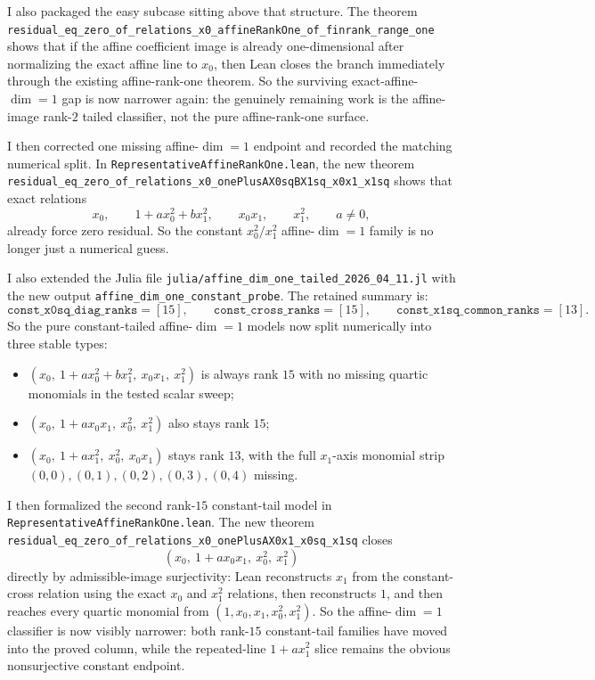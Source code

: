 \documentclass[11pt]{article}
\begin{document}
I also packaged the easy subcase sitting above that structure. The theorem
\texttt{residual\_eq\_zero\_of\_relations\_x0\_affineRankOne\_of\_finrank\_range\_one}
shows that if the affine coefficient image is already one-dimensional after
normalizing the exact affine line to \(x_0\), then Lean closes the branch
immediately through the existing affine-rank-one theorem. So the surviving
exact-affine-\(\dim=1\) gap is now narrower again: the genuinely remaining work
is the affine-image rank-\(2\) tailed classifier, not the pure affine-rank-one
surface.

I then corrected one missing affine-\(\dim=1\) endpoint and recorded the
matching numerical split. In
\texttt{RepresentativeAffineRankOne.lean}, the new theorem
\texttt{residual\_eq\_zero\_of\_relations\_x0\_onePlusAX0sqBX1sq\_x0x1\_x1sq}
shows that exact relations
\[
  x_0,\qquad 1 + a x_0^2 + b x_1^2,\qquad x_0x_1,\qquad x_1^2,
  \qquad a \ne 0,
\]
already force zero residual. So the constant \(x_0^2/x_1^2\) affine-\(\dim=1\)
family is no longer just a numerical guess.

I also extended the Julia file
\texttt{julia/affine\_dim\_one\_tailed\_2026\_04\_11.jl} with the new output
\texttt{affine\_dim\_one\_constant\_probe}. The retained summary is:
\[
  \texttt{const\_x0sq\_diag\_ranks}=[15],\qquad
  \texttt{const\_cross\_ranks}=[15],\qquad
  \texttt{const\_x1sq\_common\_ranks}=[13].
\]
So the pure constant-tailed affine-\(\dim=1\) models now split numerically into
three stable types:
\begin{itemize}
\item \((x_0,\ 1 + a x_0^2 + b x_1^2,\ x_0x_1,\ x_1^2)\) is always rank \(15\)
with no missing quartic monomials in the tested scalar sweep;
\item \((x_0,\ 1 + a x_0x_1,\ x_0^2,\ x_1^2)\) also stays rank \(15\);
\item \((x_0,\ 1 + a x_1^2,\ x_0^2,\ x_0x_1)\) stays rank \(13\), with the full
\(x_1\)-axis monomial strip \((0,0),(0,1),(0,2),(0,3),(0,4)\) missing.
\end{itemize}
I then formalized the second rank-\(15\) constant-tail model in
\texttt{RepresentativeAffineRankOne.lean}. The new theorem
\texttt{residual\_eq\_zero\_of\_relations\_x0\_onePlusAX0x1\_x0sq\_x1sq}
closes
\[
  (x_0,\ 1 + a x_0x_1,\ x_0^2,\ x_1^2)
\]
directly by admissible-image surjectivity: Lean reconstructs \(x_1\) from the
constant-cross relation using the exact \(x_0\) and \(x_1^2\) relations, then
reconstructs \(1\), and then reaches every quartic monomial from
\((1,x_0,x_1,x_0^2,x_1^2)\). So the affine-\(\dim=1\) classifier is now
visibly narrower: both rank-\(15\) constant-tail families have moved into the
proved column, while the repeated-line \(1 + a x_1^2\) slice remains the
obvious nonsurjective constant endpoint.
\end{document}
